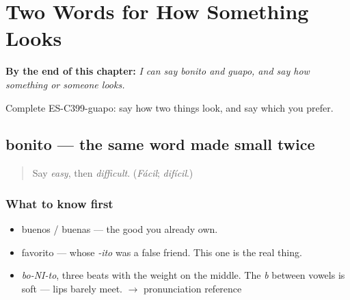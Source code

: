 
\chapter{Two Words for How Something Looks}
\label{ch:bonito-y-guapo}

\begin{chapteropening}
\textbf{By the end of this chapter:} \emph{I can say bonito and guapo, and say how something or someone looks.}

Complete ES-C399-guapo: say how two things look, and say which you prefer.
\end{chapteropening}

\section[bonito]{bonito — the same word made small twice}

\label{lesson:ES-C399-bonito}



\begin{quote}
Say \emph{easy}, then \emph{difficult}. (\emph{Fácil}; \emph{difícil}.)
\end{quote}

\subsection*{What to know first}
\begin{itemize}
\raggedright
  \item buenos / buenas — the good you already own.
  \item favorito — whose \emph{-ito} was a false friend. This one is the real thing.
\end{itemize}

\begin{sounds}
\begin{itemize}
\raggedright
  \item \emph{bo-NI-to}, three beats with the weight on the middle. The \emph{b} between vowels is soft — lips barely meet. $\to$ pronunciation reference
\end{itemize}
\end{sounds}

